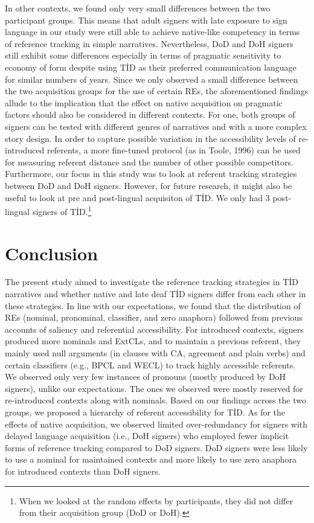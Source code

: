 \documentclass[]{elsarticle} %
\begin{document}
In other contexts, we found only very small differences between the two
participant groups. This means that adult signers with late exposure to
sign language in our study were still able to achieve native-like
competency in terms of reference tracking in simple narratives.
Nevertheless, DoD and DoH signers still exhibit some differences
especially in terms of pragmatic sensitivity to economy of form despite
using TİD as their preferred communication language for similar numbers
of years. Since we only observed a small difference between the two
acquisition groups for the use of certain REs, the aforementioned
findings allude to the implication that the effect on native acquisition
on pragmatic factors should also be considered in different contexts.
For one, both groups of signers can be tested with different genres of
narratives and with a more complex story design. In order to capture
possible variation in the accessibility levels of re-introduced
referents, a more fine-tuned protocol (as in Toole, 1996) can be used
for measuring referent distance and the number of other possible
competitors. Furthermore, our focus in this study was to look at
referent tracking strategies between DoD and DoH signers. However, for
future research, it might also be useful to look at pre and post-lingual
acquisiton of TİD. We only had 3 post-lingual signers of
TİD.\footnote{When we looked at the random effects by participants, they did not differ from their acquisition group (DoD or DoH).}

\hypertarget{conclusion}{%
\section{Conclusion}\label{conclusion}}

The present study aimed to investigate the reference tracking strategies
in TİD narratives and whether native and late deaf TİD signers differ
from each other in these strategies. In line with our expectations, we
found that the distribution of REs (nominal, pronominal, classifier, and
zero anaphora) followed from previous accounts of saliency and
referential accessibility. For introduced contexts, signers produced
more nominals and ExtCLs, and to maintain a previous referent, they
mainly used null arguments (in clauses with CA, agreement and plain
verbs) and certain classifiers (e.g., BPCL and WECL) to track highly
accessible referents. We observed only very few instances of pronouns
(mostly produced by DoH signers), unlike our expectations. The ones we
observed were mostly reserved for re-introduced contexts along with
nominals. Based on our findings across the two groups, we proposed a
hierarchy of referent accessibility for TİD. As for the effects of
native acquisition, we observed limited over-redundancy for signers with
delayed language acquisition (i.e., DoH signers) who employed fewer
implicit forms of reference tracking compared to DoD signers. DoD
signers were less likely to use a nominal for maintained contexts and
more likely to use zero anaphora for introduced contexts than DoH
signers.
\end{document}
